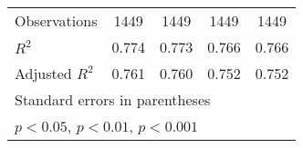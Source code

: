 {\begin{tabular}{l*{4}{c}}
\midrule
Observations        &        1449         &        1449         &        1449         &        1449         \\
\(R^{2}\)           &       0.774         &       0.773         &       0.766         &       0.766         \\
Adjusted \(R^{2}\)  &       0.761         &       0.760         &       0.752         &       0.752         \\
\bottomrule
\multicolumn{5}{l}{\footnotesize Standard errors in parentheses}\\
\multicolumn{5}{l}{\footnotesize \sym{*} \(p<0.05\), \sym{**} \(p<0.01\), \sym{***} \(p<0.001\)}\\
\end{tabular}
}
